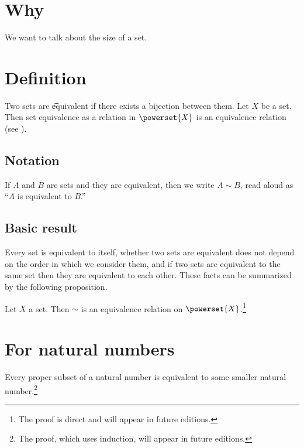 

\section*{Why}

We want to talk about the size of a set.

\section*{Definition}

Two sets are \t{equivalent} if there exists a bijection between them.
Let $X$ be a set.
Then set equivalence as a relation in $\powerset{X}$ is an equivalence relation (see ).

\subsection*{Notation}

If $A$ and $B$ are sets and they are equivalent, then we write $A \sim B$, read aloud as ``$A$ is equivalent to $B$.''

\subsection*{Basic result}

Every set is equivalent to itself, whether two sets are equivalent does not depend on the order in which we consider them, and if two sets are equivalent to the same set then they are equivalent to each other.
These facts can be summarized by the following proposition.

\begin{proposition}
Let $X$ a set. Then $\sim$ is an equivalence relation on $\powerset{X}$.\footnote{The proof is direct and will appear in future editions.}
\end{proposition}

\section*{For natural numbers}

\begin{proposition}
Every proper subset of a natural number is equivalent to some smaller natural number.\footnote{The proof, which uses induction, will appear in future editions.}
\end{proposition}

